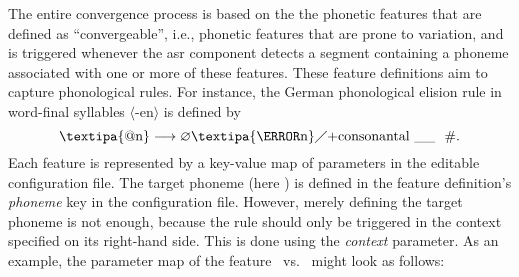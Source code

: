 The entire convergence process is based on the the phonetic features that are defined as \enquote{convergeable}, i.e., phonetic features that are prone to variation, and is triggered whenever the \ac{asr} component detects a segment containing a phoneme associated with one or more of these features.
These feature definitions aim to capture phonological rules.
For instance, the German phonological  elision rule in word-final syllables $\langle$-en$\rangle$ is defined by \citep[adapted from][pp.\,142--143]{Benware1986phonetics}
%
\begin{equation}
\text{\textipa{@n}}\longrightarrow \varnothing \text{\textipa{\s{n}}} \diagup
\text{+consonantal} \ \_\_ \ \ \text{\#} .
\label{eq:elision_rule}
\end{equation}
%
Each feature is represented by a key-value map of parameters in the editable configuration file.
The target phoneme (here ) is defined in the feature definition's \emph{phoneme} key in the configuration file.
However, merely defining the target phoneme is not enough, because the rule should only be triggered in the context specified on its right-hand side.
This is done using the \emph{context} parameter.
As an example, the parameter map of the feature \textipa{[E:]}~vs.~\textipa{[e:]} might look as follows:

